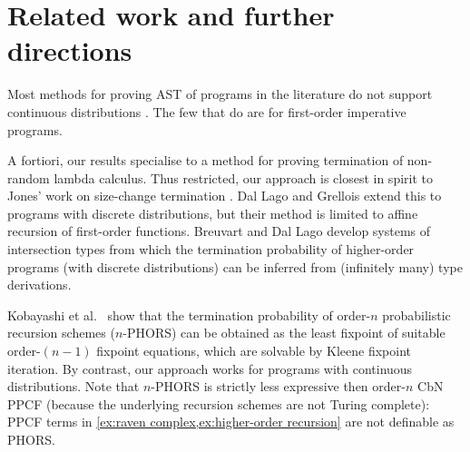 \section{Related work and further directions}
\label{sec:related}

 

Most methods for proving AST of programs in the literature do not support continuous distributions \cite{DBLP:journals/toplas/LagoG19,DBLP:journals/jacm/KaminskiKMO18,DBLP:conf/lics/OlmedoKKM16,DBLP:conf/lics/KobayashiLG19,DBLP:conf/mfcs/KaminskiK15,DBLP:series/mcs/McIverM05}.
The few that do \cite{DBLP:conf/popl/FioritiH15,DBLP:conf/pldi/ChenH20,DBLP:journals/toplas/ChatterjeeFNH18} are for first-order imperative programs.

A fortiori, our results specialise to a method for proving termination of non-random lambda calculus. 
Thus restricted, our approach is closest in spirit to Jones' work on size-change termination \cite{DBLP:journals/lmcs/JonesB08,DBLP:conf/aplas/SereniJ05}. 
Dal Lago and Grellois \cite{DBLP:journals/toplas/LagoG19} extend this to programs with discrete distributions, but their method is limited to affine recursion of first-order functions.
Breuvart and Dal Lago \cite{DBLP:conf/ppdp/BreuvartL18} develop systems of intersection types from which the termination probability of higher-order programs (with discrete distributions) can be inferred from (infinitely many) type derivations. 

Kobayashi et al.~\cite{DBLP:conf/lics/KobayashiLG19} show that the termination probability of order-$n$ probabilistic recursion schemes ($n$-PHORS) can be obtained as the least fixpoint of suitable order-$(n-1)$ fixpoint equations, which are solvable by Kleene fixpoint iteration.  
By contrast, our approach works for programs with continuous distributions. 
Note that $n$-PHORS is strictly less expressive then order-$n$ CbN PPCF (because the underlying recursion schemes are not Turing complete):
PPCF terms in \cref{ex:raven complex,ex:higher-order recursion}
are not definable as PHORS.

